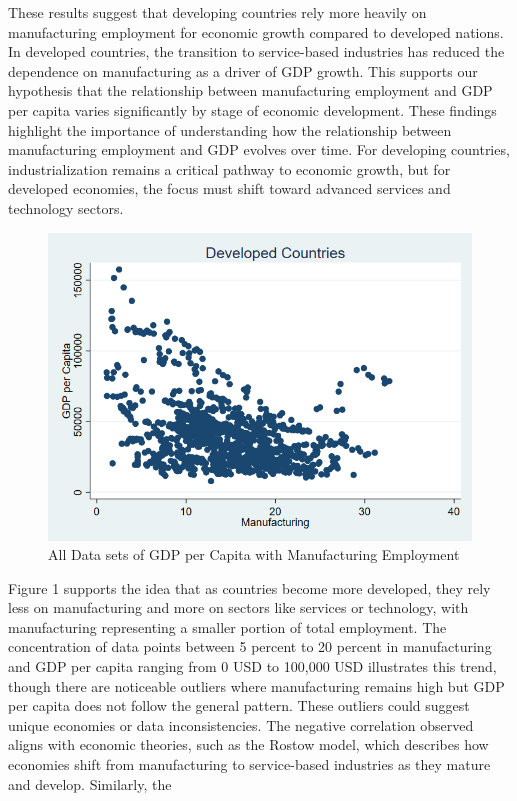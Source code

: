 \documentclass[12pt]{article}
\begin{document}
    These results suggest that developing countries rely more heavily on manufacturing employment for economic growth compared to developed nations. In developed countries, the transition to service-based industries has reduced the dependence on manufacturing as a driver of GDP growth. This supports our hypothesis that the relationship between manufacturing employment and GDP per capita varies significantly by stage of economic development.
    These findings highlight the importance of understanding how the relationship between manufacturing employment and GDP evolves over time. For developing countries, industrialization remains a critical pathway to economic growth, but for developed economies, the focus must shift toward advanced services and technology sectors.

\begin{figure}
    \centering
    \includegraphics[width=0.5\linewidth]{Variable Graphs/New Scatterplot_Dvlped.png}
    \caption{All Data sets of GDP per Capita with Manufacturing Employment}
    \label{figure 1}
\end{figure}

Figure 1 supports the idea that as countries become more developed, they rely less on manufacturing and more on sectors like services or technology, with manufacturing representing a smaller portion of total employment. The concentration of data points between 5 percent to 20 percent in manufacturing and GDP per capita ranging from 0 USD to 100,000 USD illustrates this trend, though there are noticeable outliers where manufacturing remains high but GDP per capita does not follow the general pattern. These outliers could suggest unique economies or data inconsistencies. The negative correlation observed aligns with economic theories, such as the Rostow model, which describes how economies shift from manufacturing to service-based industries as they mature and develop.
Similarly, the 
\end{document}
